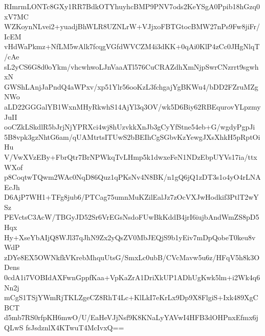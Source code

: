 RImrmLONTc8GXy1RR7BdkOTYhuyhcBMP9PNV7ods2KeYSgA0Ppib18hGzq0xV7MC
WZKoynNLvei2+yuadjBhWLR8UZNLrW+VJjxoFBTGtocBMW27nPs9Fw8jiFr/IcEM
vHdWaPkmz+NfLM5wAlk7fcqgVGfdWVCZM4i3dKK+0qAi0KlP4zCc0JHgNlqT/cAe
sL2yCS6G8d0oYkm/vhcwhwoLJnVaaATl576CuCRAZdhXmNjpSwrCNzrrt9sgwhxN
GWShLAnjJaPndQ4aWPxv/xp51Ylr56ooKzL3fchgajYgBKWu4/bDD2FZruMZgNWo
aLD22GGGalYB1WxnMHyRkwhS14AjYl3q3OV/wk5D6Biy62RBEqurovYLpzmyJuII
ooCZkLSkdlR5bJrjNjYPRXci4wj8hUzvkkXnJb3gCyYfStne54eb+G/wgdyPgpJi
5B8vpk3gzNhtG6am/qUAMtrtsITUwS2bBEIhCgSGbvKzYewgJXsXhkH5pRptOiHu
V/VwXVzEBy+FbrQtr7BrNPWkqTvLHmp5k1dwxeFeN1NDzEbpUYVs17ia/ttxWXof
p8CoqtwTQwm2WAc0NqD86Quz1qPKsNv4N8BK/n1gQ6jQ1zDT3s1o4yO4rLNAEcJh
D6AjP7WH1+TFg8jub6/PTCag75umnMuKZilEalJz7zOcVXJwHodkif3PtlT2wYSz
PEVctsC3AcW/TBGyJD52Sr6VrEGsNsdoFUwBkKddB4jrI6iujbAndWmZS8pD5Hqx
Hy+XseYbAIjQ8WJl37qJhN9Zx2yQsZV0MbJEQjS9b1yEiv7mDpQobeT0keu8vWdP
zDYe8EX5OWNkfkVKrebMhquUtsG/SmxLc0ubB/CVcMavw5u6z/HFqV5h8k3ODens
0cdA1i7VOBIdAXFwnGppfKaa+VpKaZrA1DriXkUP1ADhUgKwk5lm+i2Wk4q6Nn2j
mCgS1TSjYWmRjTKLZgeCZ8RhT4Lc+KlLkI7eKrLx9Dp9X8FlgiS+Ixk489XgCBCT
d5mb7RS0rfpKH6mwO/U/EaHeVJjNsf9K8KNaLyYAVwI4HFB3dOHPnxEfmx6jQLwS
fsJsdznlX4KTwuT4McIvxQ==
